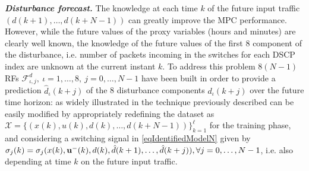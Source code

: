 
\textbf{\emph{Disturbance forecast.}} The knowledge at each time $k$ of the future input traffic $(d(k+1), \ldots, d(k+N-1))$ can greatly improve the MPC performance. However, while the future values of the proxy variables (hours and minutes) are clearly well known, the knowledge of the future values of the first 8 component of the disturbance, i.e. number of packets incoming in the switches for each DSCP index are unknown at the current instant $k$. To address this problem $8(N-1)$ RFs $\mathcal{F}^d_{\iota,j},\ \iota=1,\ldots,8,\ j = 0,\ldots,N-1$ have been built in order to provide a prediction $\hat d_\iota(k+j)$ of the 8 disturbance components $d_\iota(k+j)$ over the future time horizon: as widely illustrated in \cite{SmarraADHS2018,smarraNAHS2020} the technique previously described can be easily modified by appropriately redefining the dataset as $\mathcal{X} = \{(x(k), u(k), d(k),\ldots,d(k+N-1))\}_{k=1}^{\ell}$ for the training phase, and considering a switching signal in \eqref{eqIdentifiedModelN} given by $\sigma_j(k) = \sigma_j(x(k),\bold{u^-}(k),d(k),\hat d(k+1),\ldots,\hat d(k+j)), \forall j=0,\ldots,N-1$, i.e. also depending at time $k$ on the future input traffic.

